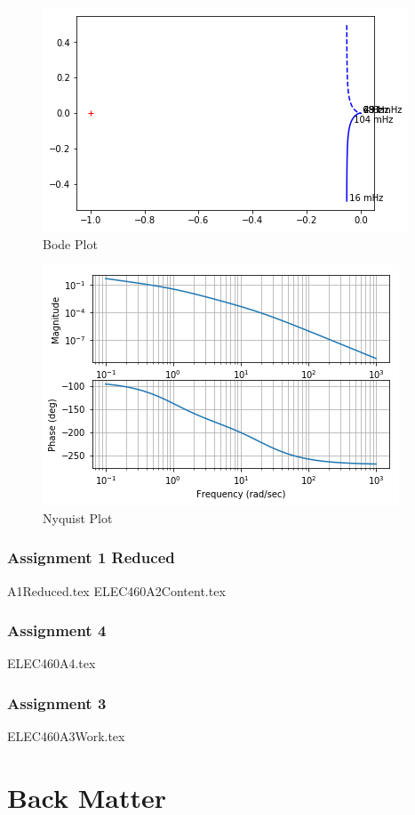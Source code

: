\documentclass{scrreprt}
\theoremstyle{plain}
\theoremstyle{definition}
\theoremstyle{remark}
\begin{document}
\begin{figure}
	\includegraphics[width=0.7\linewidth]{Assignments/A1/ipython_files/qt_img494204706881540}
	\caption{Bode Plot}
\end{figure}

\begin{figure}
	\includegraphics[width=0.7\linewidth]{Assignments/A1/ipython_files/qt_img492813137477636}
	\caption{Nyquist Plot}
\end{figure}

\section{Assignment 1 Reduced}
{A1Reduced.tex}
{ELEC460A2Content.tex}
\section{Assignment 4}
{ELEC460A4.tex}
\section{Assignment 3}
{ELEC460A3Work.tex}
\part{Back Matter}
\end{document}
